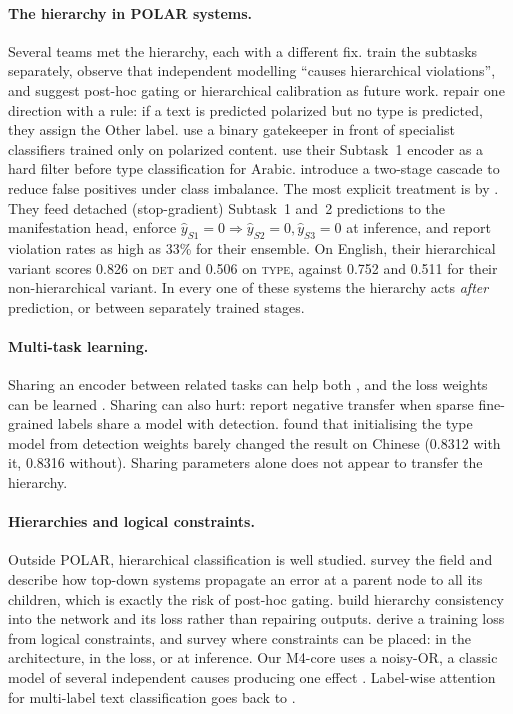 \documentclass[11pt]{article}
\newcommand{\DET}{\textsc{det}}
\newcommand{\TYPE}{\textsc{type}}
\begin{document}
\paragraph{The hierarchy in POLAR systems.}
Several teams met the hierarchy, each with a different fix.
\citet{guo-chang-2026-yeze} train the subtasks separately, observe that
independent modelling ``causes hierarchical violations'', and suggest
post-hoc gating or hierarchical calibration as future work.
\citet{lin-etal-2026-nycu} repair one direction with a rule: if a text is
predicted polarized but no type is predicted, they assign the Other label.
\citet{mohammad-2026-polafusion} use a binary gatekeeper in front of
specialist classifiers trained only on polarized content.
\citet{djamai-etal-2026-namaa} use their Subtask~1 encoder as a hard filter
before type classification for Arabic. \citet{iannielli-etal-2026-minds}
introduce a two-stage cascade to reduce false positives under class
imbalance. The most explicit treatment is by
\citet{maharjan-etal-2026-sagarmatha}. They feed detached (stop-gradient)
Subtask~1 and~2 predictions to the manifestation head, enforce
$\hat y_{S1}=0 \Rightarrow \hat y_{S2}=0, \hat y_{S3}=0$ at inference, and
report violation rates as high as 33\% for their ensemble. On English, their
hierarchical variant scores 0.826 on \DET{} and 0.506 on \TYPE{}, against
0.752 and 0.511 for their non-hierarchical variant. In every one of these
systems the hierarchy acts \emph{after} prediction, or between separately
trained stages.

\paragraph{Multi-task learning.}
Sharing an encoder between related tasks can help both
\citep{caruana1997}, and the loss weights can be learned
\citep{kendall2018}. Sharing can also hurt: \citet{guo-chang-2026-yeze}
report negative transfer when sparse fine-grained labels share a model with
detection. \citet{le-phung-2026-alphalyrae} found that initialising the
type model from detection weights barely changed the result on Chinese
(0.8312 with it, 0.8316 without). Sharing parameters alone does not appear to transfer the
hierarchy.

\paragraph{Hierarchies and logical constraints.}
Outside POLAR, hierarchical classification is well studied.
\citet{silla2011survey} survey the field and describe how top-down systems
propagate an error at a parent node to all its children, which is exactly
the risk of post-hoc gating. \citet{giunchiglia2020} build hierarchy
consistency into the network and its loss rather than repairing outputs.
\citet{xu2018semantic} derive a training loss from logical constraints, and
\citet{giunchiglia2022survey} survey where constraints can be placed: in the
architecture, in the loss, or at inference. Our M4-core uses a noisy-OR, a
classic model of several independent causes producing one effect
\citep{pearl1988}. Label-wise attention for multi-label text classification
goes back to \citet{mullenbach-etal-2018-explainable}.
\end{document}
